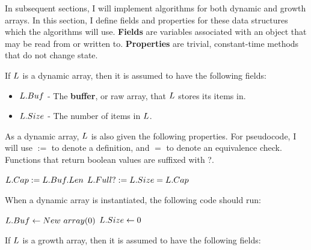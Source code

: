 In subsequent sections, I will implement algorithms for both dynamic and growth arrays. In this section, I define fields and properties for these data structures which the algorithms will use. \textbf{Fields} are variables associated with an object that may be read from or written to. \textbf{Properties} are trivial, constant-time methods that do not change state.

If $\VarList$ is a dynamic array, then it is assumed to have the following fields:

\begin{itemize}
	\item $L.Buf$ - The \textbf{buffer}, or raw array, that $\VarList$ stores its items in.
	\item $L.Size$ - The number of items in $\VarList$.
\end{itemize}

As a dynamic array, $\VarList$ is also given the following properties. {\HdrNote} For pseudocode, I will use $:=$ to denote a definition, and $=$ to denote an equivalence check. Functions that return boolean values are suffixed with ?.

\begin{algorithm}
	\begin{algorithmic}
		\State $L.Cap := L.Buf.Len$
		\State
		\State $L.Full? := L.Size = L.Cap$
	\end{algorithmic}
\end{algorithm}

When a dynamic array is instantiated, the following code should run:

\begin{algorithm}
	\begin{algorithmic}
		\Procedure{$\FuncConstructor$}{$\VarList$}
			\State $L.Buf \gets New\ array(0)$
			\State $L.Size \gets 0$
		\EndProcedure
	\end{algorithmic}
\end{algorithm}

If $\VarList$ is a growth array, then it is assumed to have the following fields:

